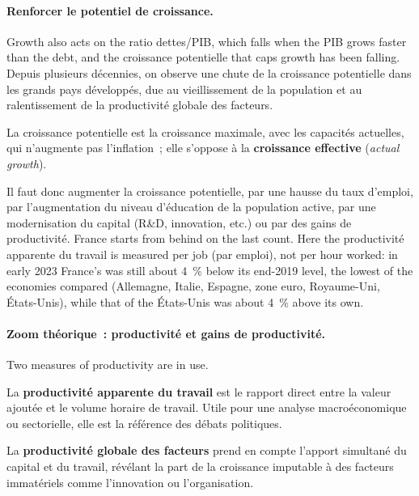 \paragraph{Renforcer le potentiel de croissance.}
Growth also acts on the ratio dettes/PIB, which falls when the PIB grows faster
than the debt, and the croissance potentielle that caps growth has been falling.
Depuis plusieurs décennies, on observe une chute de
la croissance potentielle dans les grands pays développés, due au
vieillissement de la population et au ralentissement de la productivité globale
des facteurs.

\begin{definition}
  La croissance potentielle est la croissance maximale, avec les capacités
  actuelles, qui n'augmente pas l'inflation~; elle s'oppose à la
  \textbf{croissance effective} (\textit{actual growth}).
\end{definition}

Il faut donc augmenter la croissance potentielle, par une hausse du taux
d'emploi, par l'augmentation du niveau d'éducation de la population active, par
une modernisation du capital (R\&D, innovation, etc.) ou par des gains de
productivité. France starts from behind on the last count. Here the
productivité apparente du travail is measured per job (par emploi), not per
hour worked: in early 2023 France's was still about 4~\% below its end-2019
level, the lowest of the economies compared (Allemagne, Italie, Espagne, zone
euro, Royaume-Uni, États-Unis), while that of the États-Unis was about 4~\%
above its own.

\paragraph{Zoom théorique~: productivité et gains de productivité.}
Two measures of productivity are in use.

\begin{definition}
  La \textbf{productivité apparente du travail} est le rapport direct entre la
  valeur ajoutée et le volume horaire de travail. Utile pour une analyse
  macroéconomique ou sectorielle, elle est la référence des débats politiques.
\end{definition}

\begin{definition}
  La \textbf{productivité globale des facteurs} prend en compte l'apport
  simultané du capital et du travail, révélant la part de la croissance
  imputable à des facteurs immatériels comme l'innovation ou l'organisation.
\end{definition}

